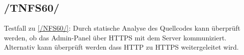 \subsection*{/TNFS60/}
\label{/TNFS60/} Testfall zu \ref{/NFS60/}: Durch \gls{statische Analyse} des \Gls{Quellcode}s kann überprüft werden, ob das \Gls{Admin-Panel} über \Gls{HTTPS} mit dem \Gls{Server} kommuniziert.
Alternativ kann überprüft werden dass \Gls{HTTP} zu \Gls{HTTPS} weitergeleitet wird.